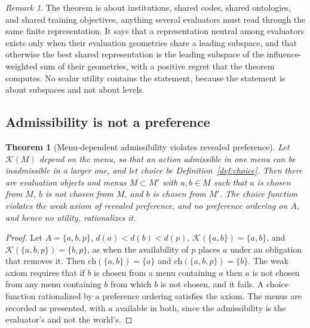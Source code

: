 \documentclass[11pt]{article}
\newtheorem{theorem}{Theorem}
\theoremstyle{definition}
\theoremstyle{remark}
\newtheorem*{remark}{Remark}
\newcommand{\K}{\mathcal{K}}
\begin{document}
\begin{remark}
The theorem is about institutions, shared codes, shared ontologies, and shared training objectives, anything several evaluators must read through the same finite representation.
It says that a representation neutral among evaluators exists only when their evaluation geometries share a leading subspace, and that otherwise the best shared representation is the leading subspace of the influence-weighted sum of their geometries, with a positive regret that the theorem computes.
No scalar utility contains the statement, because the statement is about subspaces and not about levels.
\end{remark}

\subsection{Admissibility is not a preference}

\begin{theorem}[Menu-dependent admissibility violates revealed preference]
\label{thm:admiss}
Let $\K(M)$ depend on the menu, so that an action admissible in one menu can be inadmissible in a larger one, and let choice be Definition~\ref{def:choice}.
Then there are evaluation objects and menus $M\subset M'$ with $a,b\in M$ such that $a$ is chosen from $M$, $b$ is not chosen from $M$, and $b$ is chosen from $M'$.
The choice function violates the weak axiom of revealed preference, and no preference ordering on $A$, and hence no utility, rationalizes it.
\end{theorem}

\begin{proof}
Let $A=\{a,b,p\}$, $d(a)<d(b)<d(p)$, $\K(\{a,b\})=\{a,b\}$, and $\K(\{a,b,p\})=\{b,p\}$, as when the availability of $p$ places $a$ under an obligation that removes it.
Then $\mathrm{ch}(\{a,b\})=\{a\}$ and $\mathrm{ch}(\{a,b,p\})=\{b\}$.
The weak axiom requires that if $b$ is chosen from a menu containing $a$ then $a$ is not chosen from any menu containing $b$ from which $b$ is not chosen, and it fails.
A choice function rationalized by a preference ordering satisfies the axiom.
The menus are recorded as presented, with $a$ available in both, since the admissibility is the evaluator's and not the world's.
\end{proof}
\end{document}
